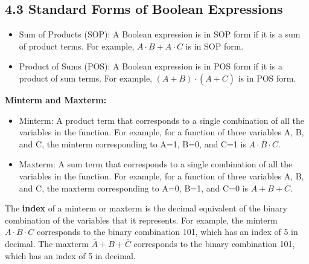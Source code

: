 \documentclass[11pt,a4paper]{article}
\providecommand{\tightlist}{\setlength{\itemsep}{1pt}\setlength{\parskip}{0pt}}
\begin{document}
\subsection{4.3 Standard Forms of Boolean
Expressions}\label{standard-forms-of-boolean-expressions}

\begin{itemize}
\tightlist
\item
  Sum of Products (SOP): A Boolean expression is in SOP form if it is a
  sum of product terms. For example,
  \(A \cdot B + \overline{A} \cdot C\) is in SOP form.
\item
  Product of Sums (POS): A Boolean expression is in POS form if it is a
  product of sum terms. For example,
  \((A + B) \cdot (\overline{A} + C)\) is in POS form.
\end{itemize}

\textbf{Minterm and Maxterm:}

\begin{itemize}
\tightlist
\item
  Minterm: A product term that corresponds to a single combination of
  all the variables in the function. For example, for a function of
  three variables A, B, and C, the minterm corresponding to A=1, B=0,
  and C=1 is \(A \cdot \overline{B} \cdot C\).
\item
  Maxterm: A sum term that corresponds to a single combination of all
  the variables in the function. For example, for a function of three
  variables A, B, and C, the maxterm corresponding to A=0, B=1, and C=0
  is \(\overline{A} + B + \overline{C}\).
\end{itemize}

The \textbf{index} of a minterm or maxterm is the decimal equivalent of
the binary combination of the variables that it represents. For example,
the minterm \(A \cdot \overline{B} \cdot C\) corresponds to the binary
combination 101, which has an index of 5 in decimal. The maxterm
\(\overline{A} + B + \overline{C}\) corresponds to the binary
combination 101, which has an index of 5 in decimal.
\end{document}

